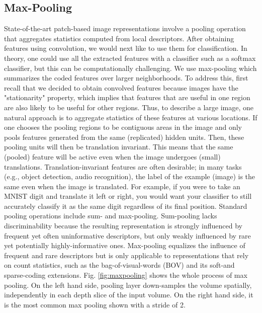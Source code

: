 \subsection{Max-Pooling} 
State-of-the-art patch-based image representations involve a pooling operation that aggregates statistics computed from local descriptors. After obtaining features using convolution, we would next like to use them for classification. In theory, one could use all the extracted features with a classifier such as a softmax classifier, but this can be computationally challenging. We use max-pooling which summarizes the coded features over larger neighborhoods. To address this, first recall that we decided to obtain convolved features because images have the "stationarity" property, which implies that features that are useful in one region are also likely to be useful for other regions. Thus, to describe a large image, one natural approach is to aggregate statistics of these features at various locations. If one chooses the pooling regions to be contiguous areas in the image and only pools features generated from the same (replicated) hidden units. Then, these pooling units will then be translation invariant. This means that the same (pooled) feature will be active even when the image undergoes (small) translations. Translation-invariant features are often desirable; in many tasks (e.g., object detection, audio recognition), the label of the example (image) is the same even when the image is translated. For example, if you were to take an MNIST digit and translate it left or right, you would want your classifier to still accurately classify it as the same digit regardless of its final position. Standard pooling operations include sum- and max-pooling. Sum-pooling lacks discriminability because the resulting representation is strongly influenced by frequent yet often uninformative descriptors, but only weakly influenced by rare yet potentially highly-informative ones. Max-pooling equalizes the influence of frequent and rare descriptors but is only applicable to representations that rely on count statistics, such as the bag-of-visual-words (BOV) and its soft-and sparse-coding extensions. Fig. \ref{fig:maxpooling} shows the whole process of max pooling. On the left hand side, pooling layer down-samples the volume spatially, independently in each depth slice of the input volume. On the right hand side, it is the most common max pooling shown with a stride of 2.
